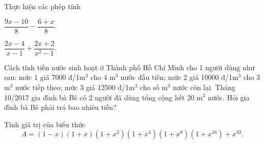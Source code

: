 \begin{bt}%
Thực hiện các phép tính
\begin{enumEX}{2}
	\item $\dfrac{9x-10}{8}-\dfrac{6+x}{8}$.
	\item $\dfrac{2x-4}{x-1}+\dfrac{2x+2}{x^2-1}$.
\end{enumEX}
\end{bt}

\begin{bt}%
Cách tính tiền nước sinh hoạt ở Thành phố Hồ Chí Minh cho 1 người dùng như sau: mức 1 giá 7000 đ/1m$^3$ cho 4 m$^3$ nước đầu tiên; mức 2 giá 10000
đ/1m$^3$ cho 3 m$^3$ nước tiếp theo; mức 3 giá 12500 đ/1m$^3$ cho số m$^3$ nước còn lại. Tháng 10/2017 gia đình bà Bê có 2 người đã dùng tổng cộng hết 20 m$^3$ nước. Hỏi gia đình bà Bê phải trả bao nhiêu tiền?
\end{bt}

\begin{bt}%
Tính giá trị của biểu thức
$$ A=(1-x)(1+x)(1+x^2)(1+x^4)(1+x^8)(1+x^{16})+x^{32}. $$
\end{bt}

